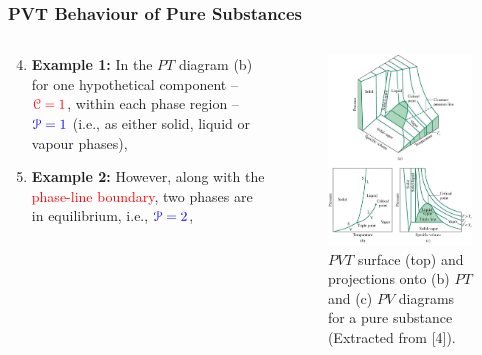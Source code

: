 \documentclass[10pt,compress,handout,ignorenonframetext]{beamer}
\begin{document}
\begin{frame}
 \frametitle{PVT Behaviour of Pure Substances}
 \begin{columns}
   \begin{column}[l]{0.5\linewidth}
     \begin{enumerate}\setcounter{enumi}{3}\scriptsize
        \item <1-> {\bf Example 1:} In the $PT$ diagram (b) for one hypothetical component -- $\textcolor{red}{\mathcal{C}=1}$, within each phase region -- $\textcolor{blue}{\mathcal{P}=1}$ (i.e., as either solid, liquid or vapour phases),
        \item <2-> {\bf Example 2:} However, along with the \textcolor{red}{phase-line boundary}, two phases are in equilibrium, i.e., $\textcolor{blue}{\mathcal{P}=2}$,%
     \end{enumerate}
  \end{column}
  \begin{column}[l]{0.5\linewidth}
   \begin{figure}%
    \begin{center}
     \includegraphics[width=4.cm,clip]{./Pics/PVT_Surface.jpg}
    \end{center}
    \scriptsize\caption{\scriptsize$PVT$ surface (top) and projections onto (b) $PT$ and (c) $PV$ diagrams for a pure substance (Extracted from [4]).}
   \end{figure}    
  \end{column}
 \end{columns}
\end{frame}
 
\end{document}
